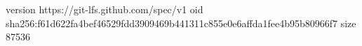 version https://git-lfs.github.com/spec/v1
oid sha256:f61d622fa4bef46529fdd3909469b441311c855e0e6affda1fee4b95b80966f7
size 87536
